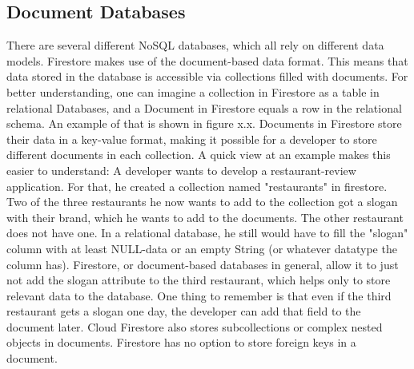 \subsection{Document Databases}
There are several different NoSQL databases, which all rely on different data models. Firestore makes use of the document-based data format. This means that data stored in the database is accessible via collections filled with documents. For better understanding, one can imagine a collection in Firestore as a table in relational Databases, and a Document in Firestore equals a row in the relational schema. An example of that is shown in figure x.x. Documents in Firestore store their data in a key-value format, making it possible for a developer to store different documents in each collection. A quick view at an example makes this easier to understand: A developer wants to develop a restaurant-review application. For that, he created a collection named "restaurants" in firestore. Two of the three restaurants he now wants to add to the collection got a slogan with their brand, which he wants to add to the documents. The other restaurant does not have one. In a relational database, he still would have to fill the "slogan" column with at least NULL-data or an empty String (or whatever datatype the column has). Firestore, or document-based databases in general, allow it to just not add the slogan attribute to the third restaurant, which helps only to store relevant data to the database. One thing to remember is that even if the third restaurant gets a slogan one day, the developer can add that field to the document later. Cloud Firestore also stores subcollections or complex nested objects in documents. Firestore has no option to store foreign keys in a document.
